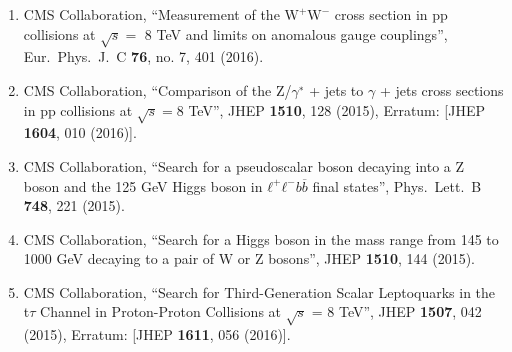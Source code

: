 \begin{enumerate}
\item CMS Collaboration, ``Measurement of the ${{\mathrm{W} }^{+} }\mathrm{W}^{-} $ cross section in pp collisions at $\sqrt{s} =$ 8 TeV and limits on anomalous gauge couplings'', Eur.\ Phys.\ J.\ C {\bf 76}, no. 7, 401 (2016).

\item CMS Collaboration, ``Comparison of the Z/$\gamma$$^{∗}$ + jets to $\gamma$ + jets cross sections in pp collisions at $ \sqrt{s}=8 $ TeV'', JHEP {\bf 1510}, 128 (2015), Erratum: [JHEP {\bf 1604}, 010 (2016)].

\item CMS Collaboration, ``Search for a pseudoscalar boson decaying into a Z boson and the 125 GeV Higgs boson in $ℓ^+ℓ^−b\overline{b}$ final states'', Phys.\ Lett.\ B {\bf 748}, 221 (2015).

\item CMS Collaboration, ``Search for a Higgs boson in the mass range from 145 to 1000 GeV decaying to a pair of W or Z bosons'', JHEP {\bf 1510}, 144 (2015).

\item CMS Collaboration, ``Search for Third-Generation Scalar Leptoquarks in the t$\tau$ Channel in Proton-Proton Collisions at $\sqrt{s}$ = 8 TeV'', JHEP {\bf 1507}, 042 (2015), Erratum: [JHEP {\bf 1611}, 056 (2016)].

\end{enumerate}

\fontsize{12pt}{12pt}\selectfont
